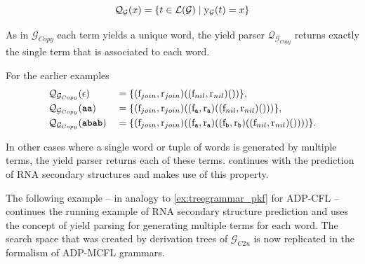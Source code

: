 \documentclass[
    a4paper,
    12pt,
    twoside,
    BCOR=12mm,
    parskip=half,
    chapterprefix,
    numbers=noenddot,
    bibliography=totoc
]{scrbook}
\begin{document}
\begin{equation}
  \label{eq:yieldparsermcfl}
	\mathcal{Q}_\mathcal{G}(x) = \{ t \in \mathcal{L}(\mathcal{G}) \mid \mathrm{y}_\mathcal{G}(t) = x \}
\end{equation}

\begin{example}[continues=ex:adp_mcfl_copylang]
	As in $\mathcal{G}_{Copy}$ each term yields a unique word, the yield parser $\mathcal{Q}_{\mathcal{G}_{Copy}}$ returns exactly the single term that is associated to each word.
	
	For the earlier examples
	\begin{align*}
		&\mathcal{Q}_{\mathcal{G}_{Copy}}(\epsilon) &&= \{(\op{f}_{join},\op{r}_{join})((\op{f}_{nil},\op{r}_{nil})())\},\\
		&\mathcal{Q}_{\mathcal{G}_{Copy}}(\ts{aa}) &&= \{(\op{f}_{join},\op{r}_{join})((\op{f}_\ts{a},\op{r}_\ts{a})((\op{f}_{nil},\op{r}_{nil})()))\},\\
		&\mathcal{Q}_{\mathcal{G}_{Copy}}(\ts{abab}) &&= \{(\op{f}_{join},\op{r}_{join})((\op{f}_\ts{a},\op{r}_\ts{a})((\op{f}_\ts{b},\op{r}_\ts{b})((\op{f}_{nil},\op{r}_{nil})())))\}.
	\end{align*}
	
	In other cases where a single word or tuple of words is generated by multiple terms, the yield parser returns each of these terms.  continues with the prediction of RNA secondary structures and makes use of this property.
\end{example}

The following example -- in analogy to \cref{ex:treegrammar_pkf} for ADP-CFL -- continues the running example of RNA secondary structure prediction and uses the concept of yield parsing for generating multiple terms for each word. The search space that was created by derivation trees of $\mathcal{G}_{C2u}$ is now replicated in the formalism of ADP-MCFL grammars.
\end{document}
